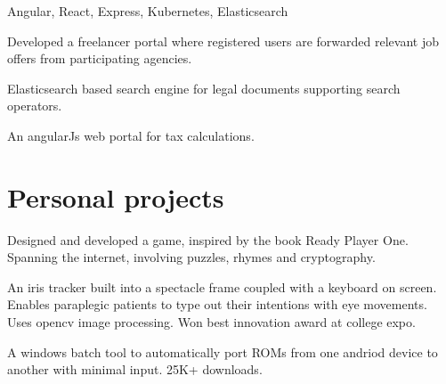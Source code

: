 \documentclass[]{font}
\begin{document}
\begin{minipage}[t]{0.66\textwidth}
Angular, React, Express, Kubernetes, Elasticsearch
\begin{tightemize}
\item Developed a freelancer portal where registered users are forwarded relevant job offers from participating agencies. 
\item Elasticsearch based search engine for legal documents supporting search operators.
\item An angularJs web portal for tax calculations.
\end{tightemize}    


\sectionsep



\section{Personal projects}

Designed and developed a game, inspired by the book Ready Player One. Spanning the internet, involving puzzles, rhymes and cryptography.
\sectionsep

An iris tracker built into a spectacle frame coupled with a keyboard on screen. Enables paraplegic patients to type out their intentions with eye movements. Uses opencv image processing. Won best innovation award at college expo.
\sectionsep

A windows batch tool to automatically port ROMs from one andriod device to another with minimal input. 25K+ downloads.
\sectionsep

\end{minipage} 
\end{document}
